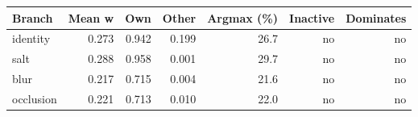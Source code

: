 \begin{tabular}{lrrrrrr}
\toprule
Branch & Mean w & Own & Other & Argmax (\%) & Inactive & Dominates \\
\midrule
identity & 0.273 & 0.942 & 0.199 & 26.7 & no & no \\
salt & 0.288 & 0.958 & 0.001 & 29.7 & no & no \\
blur & 0.217 & 0.715 & 0.004 & 21.6 & no & no \\
occlusion & 0.221 & 0.713 & 0.010 & 22.0 & no & no \\
\bottomrule
\end{tabular}
